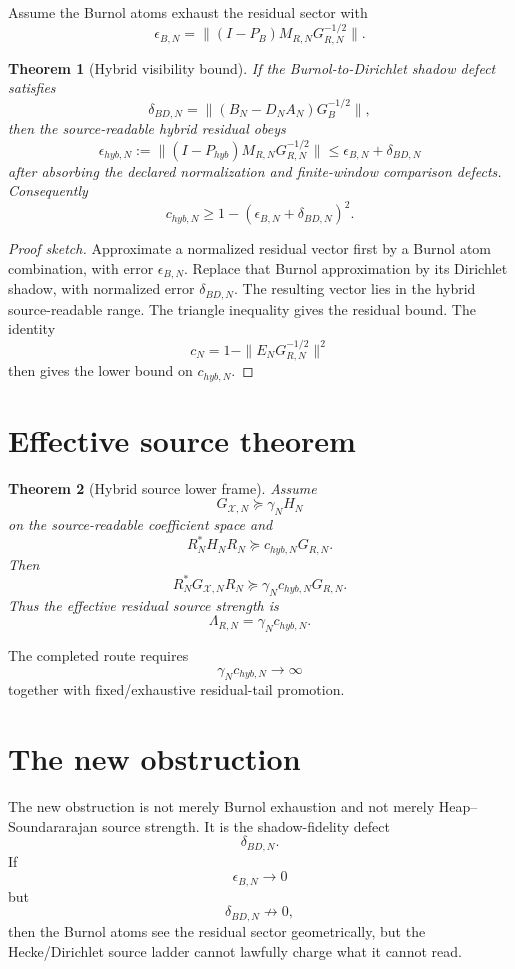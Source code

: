 \documentclass[11pt]{article}
\newtheorem{theorem}{Theorem}
\begin{document}
Assume the Burnol atoms exhaust the residual sector with
\[
\epsilon_{B,N}
=
\|(I-P_B)M_{R,N}G_{R,N}^{-1/2}\|.
\]

\begin{theorem}[Hybrid visibility bound]
If the Burnol-to-Dirichlet shadow defect satisfies
\[
\delta_{BD,N}
=
\|(B_N-D_NA_N)G_B^{-1/2}\|,
\]
then the source-readable hybrid residual obeys
\[
\epsilon_{hyb,N}
:=
\|(I-P_{hyb})M_{R,N}G_{R,N}^{-1/2}\|
\le
\epsilon_{B,N}+\delta_{BD,N}
\]
after absorbing the declared normalization and finite-window comparison defects.
Consequently
\[
c_{hyb,N}
\ge
1-(\epsilon_{B,N}+\delta_{BD,N})^2.
\]
\end{theorem}

\begin{proof}[Proof sketch]
Approximate a normalized residual vector first by a Burnol atom combination, with error
\(\epsilon_{B,N}\).  Replace that Burnol approximation by its Dirichlet shadow, with normalized
error \(\delta_{BD,N}\).  The resulting vector lies in the hybrid source-readable range.  The
triangle inequality gives the residual bound.  The identity
\[
c_N=1-\|E_NG_{R,N}^{-1/2}\|^2
\]
then gives the lower bound on \(c_{hyb,N}\).
\end{proof}

\section{Effective source theorem}

\begin{theorem}[Hybrid source lower frame]
Assume
\[
G_{\mathcal X,N}\succeq \gamma_NH_N
\]
on the source-readable coefficient space and
\[
R_N^*H_NR_N\succeq c_{hyb,N}G_{R,N}.
\]
Then
\[
R_N^*G_{\mathcal X,N}R_N
\succeq
\gamma_Nc_{hyb,N}G_{R,N}.
\]
Thus the effective residual source strength is
\[
\Lambda_{R,N}=\gamma_Nc_{hyb,N}.
\]
\end{theorem}

The completed route requires
\[
\gamma_Nc_{hyb,N}\to\infty
\]
together with fixed/exhaustive residual-tail promotion.

\section{The new obstruction}

The new obstruction is not merely Burnol exhaustion and not merely Heap--Soundararajan source
strength.  It is the shadow-fidelity defect
\[
\delta_{BD,N}.
\]
If
\[
\epsilon_{B,N}\to0
\]
but
\[
\delta_{BD,N}\not\to0,
\]
then the Burnol atoms see the residual sector geometrically, but the Hecke/Dirichlet source
ladder cannot lawfully charge what it cannot read.
\end{document}
